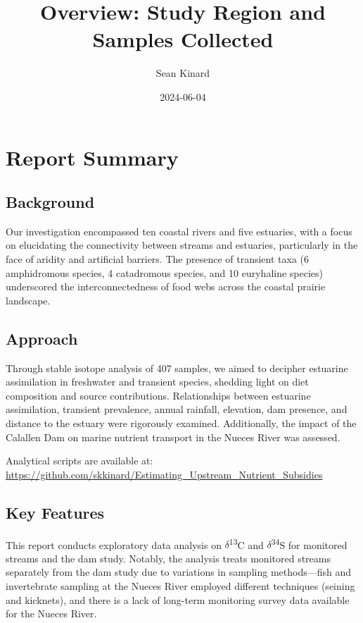 \documentclass[
]{article}
\title{Overview: Study Region and Samples Collected}
\author{Sean Kinard}
\date{2024-06-04}
\begin{document}
\maketitle

{
\setcounter{tocdepth}{2}
\tableofcontents
}
\newpage

\hypertarget{report-summary}{%
\section{Report Summary}\label{report-summary}}

\hypertarget{background}{%
\subsection{Background}\label{background}}

Our investigation encompassed ten coastal rivers and five estuaries,
with a focus on elucidating the connectivity between streams and
estuaries, particularly in the face of aridity and artificial barriers.
The presence of transient taxa (6 amphidromous species, 4 catadromous
species, and 10 euryhaline species) underscored the interconnectedness
of food webs across the coastal prairie landscape.

\hypertarget{approach}{%
\subsection{Approach}\label{approach}}

Through stable isotope analysis of 407 samples, we aimed to decipher
estuarine assimilation in freshwater and transient species, shedding
light on diet composition and source contributions. Relationships
between estuarine assimilation, transient prevalence, annual rainfall,
elevation, dam presence, and distance to the estuary were rigorously
examined. Additionally, the impact of the Calallen Dam on marine
nutrient transport in the Nueces River was assessed.

Analytical scripts are available at:
\url{https://github.com/skkinard/Estimating_Upstream_Nutrient_Subsidies}

\hypertarget{key-features}{%
\subsection{Key Features}\label{key-features}}

This report conducts exploratory data analysis on
\(\delta\)\textsuperscript{13}C and \(\delta\)\textsuperscript{34}S for
monitored streams and the dam study. Notably, the analysis treats
monitored streams separately from the dam study due to variations in
sampling methods---fish and invertebrate sampling at the Nueces River
employed different techniques (seining and kicknets), and there is a
lack of long-term monitoring survey data available for the Nueces River.
\end{document}
